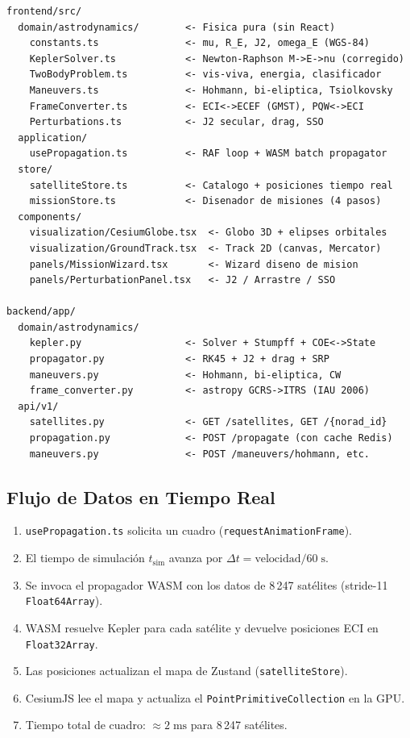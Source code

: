 \documentclass[12pt,a4paper]{article}
\newcommand{\code}[1]{\texttt{\small #1}}
\begin{document}
\begin{verbatim}
frontend/src/
  domain/astrodynamics/        <- Fisica pura (sin React)
    constants.ts               <- mu, R_E, J2, omega_E (WGS-84)
    KeplerSolver.ts            <- Newton-Raphson M->E->nu (corregido)
    TwoBodyProblem.ts          <- vis-viva, energia, clasificador
    Maneuvers.ts               <- Hohmann, bi-eliptica, Tsiolkovsky
    FrameConverter.ts          <- ECI<->ECEF (GMST), PQW<->ECI
    Perturbations.ts           <- J2 secular, drag, SSO
  application/
    usePropagation.ts          <- RAF loop + WASM batch propagator
  store/
    satelliteStore.ts          <- Catalogo + posiciones tiempo real
    missionStore.ts            <- Disenador de misiones (4 pasos)
  components/
    visualization/CesiumGlobe.tsx  <- Globo 3D + elipses orbitales
    visualization/GroundTrack.tsx  <- Track 2D (canvas, Mercator)
    panels/MissionWizard.tsx       <- Wizard diseno de mision
    panels/PerturbationPanel.tsx   <- J2 / Arrastre / SSO

backend/app/
  domain/astrodynamics/
    kepler.py                  <- Solver + Stumpff + COE<->State
    propagator.py              <- RK45 + J2 + drag + SRP
    maneuvers.py               <- Hohmann, bi-eliptica, CW
    frame_converter.py         <- astropy GCRS->ITRS (IAU 2006)
  api/v1/
    satellites.py              <- GET /satellites, GET /{norad_id}
    propagation.py             <- POST /propagate (con cache Redis)
    maneuvers.py               <- POST /maneuvers/hohmann, etc.
\end{verbatim}

\subsection{Flujo de Datos en Tiempo Real}

\begin{enumerate}
  \item \code{usePropagation.ts} solicita un cuadro (\code{requestAnimationFrame}).
  \item El tiempo de simulaci\'on $t_{\text{sim}}$ avanza por $\Delta t = \text{velocidad}/60\;\text{s}$.
  \item Se invoca el propagador WASM con los datos de 8\,247 sat\'elites (stride-11 \code{Float64Array}).
  \item WASM resuelve Kepler para cada sat\'elite y devuelve posiciones ECI en \code{Float32Array}.
  \item Las posiciones actualizan el mapa de Zustand (\code{satelliteStore}).
  \item CesiumJS lee el mapa y actualiza el \code{PointPrimitiveCollection} en la GPU.
  \item Tiempo total de cuadro: $\approx 2\;\text{ms}$ para 8\,247 sat\'elites.
\end{enumerate}
\end{document}
